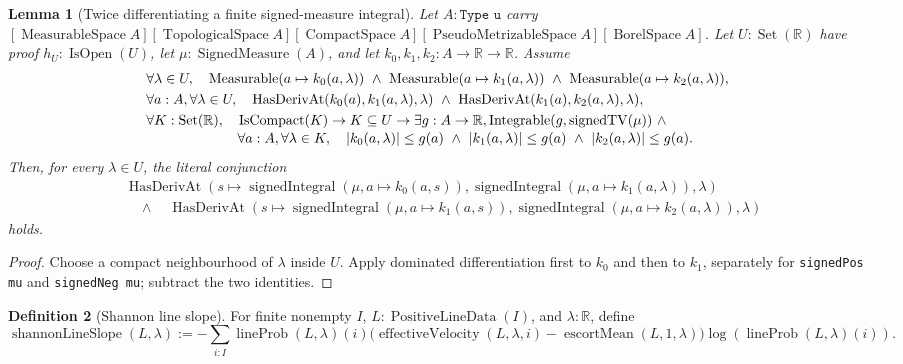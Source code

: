 \documentclass[9pt]{extarticle}
\newtheorem{lemma}{Lemma}[section]
\theoremstyle{definition}
\newtheorem{definition}[lemma]{Definition}
\theoremstyle{remark}
\newcommand{\R}{\mathbb R}
\newcommand{\abs}[1]{\left\lvert #1\right\rvert}
\begin{document}
\begin{lemma}[Twice differentiating a finite signed-measure integral]
\label{lem:signed-integral-differentiate-twice}
Let $A:\texttt{Type u}$ carry
$[\operatorname{MeasurableSpace}A]
[\operatorname{TopologicalSpace}A][\operatorname{CompactSpace}A]
[\operatorname{PseudoMetrizableSpace}A][\operatorname{BorelSpace}A]$.
Let $U:\operatorname{Set}(\R)$ have proof $h_U:\operatorname{IsOpen}(U)$, let
$\mu:\operatorname{SignedMeasure}(A)$, and let
$k_0,k_1,k_2:A\to\R\to\R$.  Assume
\begin{align*}
 &\forall\lambda\in U,\quad
   \operatorname{Measurable}(a\mapsto k_0(a,\lambda))\ \wedge\
   \operatorname{Measurable}(a\mapsto k_1(a,\lambda))\ \wedge\
   \operatorname{Measurable}(a\mapsto k_2(a,\lambda)),\\
 &\forall a:A,\forall\lambda\in U,\quad
   \operatorname{HasDerivAt}(k_0(a),k_1(a,\lambda),\lambda)\ \wedge\
   \operatorname{HasDerivAt}(k_1(a),k_2(a,\lambda),\lambda),\\
 &\forall K:\operatorname{Set}(\R),\quad
   \operatorname{IsCompact}(K)\to K\subseteq U\to
   \exists g:A\to\R,\operatorname{Integrable}
     (g,\operatorname{signedTV}(\mu))\ \wedge\\[-2pt]
 &\hspace{23mm}\forall a:A,\forall\lambda\in K,\quad
   \abs{k_0(a,\lambda)}\leq g(a)\ \wedge\
   \abs{k_1(a,\lambda)}\leq g(a)\ \wedge\
   \abs{k_2(a,\lambda)}\leq g(a).
\end{align*}
Then, for every $\lambda\in U$, the literal conjunction
\begin{align*}
 &\operatorname{HasDerivAt}
  \left(s\mapsto\operatorname{signedIntegral}
    (\mu,a\mapsto k_0(a,s)),
    \operatorname{signedIntegral}(\mu,a\mapsto k_1(a,\lambda)),\lambda\right)\\
 &\quad\wedge\quad
 \operatorname{HasDerivAt}
  \left(s\mapsto\operatorname{signedIntegral}
    (\mu,a\mapsto k_1(a,s)),
    \operatorname{signedIntegral}(\mu,a\mapsto k_2(a,\lambda)),\lambda\right)
\end{align*}
holds.
\end{lemma}

\begin{proof}
Choose a compact neighbourhood of $\lambda$ inside $U$.  Apply dominated
differentiation first to $k_0$ and then to $k_1$, separately for
\texttt{signedPos mu} and \texttt{signedNeg mu}; subtract the two identities.
\end{proof}

\begin{definition}[Shannon line slope]
\label{def:shannon-line-slope}
For finite nonempty $I$, $L:\operatorname{PositiveLineData}(I)$, and
$\lambda:\R$, define
\[
 \operatorname{shannonLineSlope}(L,\lambda):=
 -\sum_{i:I}\operatorname{lineProb}(L,\lambda)(i)
 \bigl(\operatorname{effectiveVelocity}(L,\lambda,i)
       -\operatorname{escortMean}(L,1,\lambda)\bigr)
 \log(\operatorname{lineProb}(L,\lambda)(i)).
\]
\end{definition}
\end{document}

